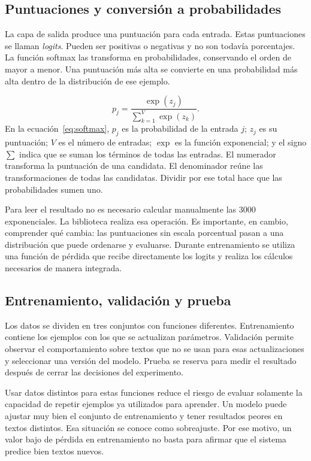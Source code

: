 \subsection{Puntuaciones y conversión a probabilidades}
La capa de salida produce una puntuación para cada entrada. Estas puntuaciones se llaman \emph{logits}. Pueden ser positivas o negativas y no son todavía porcentajes. La función softmax las transforma en probabilidades, conservando el orden de mayor a menor. Una puntuación más alta se convierte en una probabilidad más alta dentro de la distribución de ese ejemplo.

\begin{equation}\label{eq:softmax}
p_j=\frac{\exp(z_j)}{\sum_{k=1}^{V}\exp(z_k)}.
\end{equation}
En la ecuación~\ref{eq:softmax}, $p_j$ es la probabilidad de la entrada $j$; $z_j$ es su puntuación; $V$ es el número de entradas; $\exp$ es la función exponencial; y el signo $\sum$ indica que se suman los términos de todas las entradas. El numerador transforma la puntuación de una candidata. El denominador reúne las transformaciones de todas las candidatas. Dividir por ese total hace que las probabilidades sumen uno.

Para leer el resultado no es necesario calcular manualmente las 3000 exponenciales. La biblioteca realiza esa operación. Es importante, en cambio, comprender qué cambia: las puntuaciones sin escala porcentual pasan a una distribución que puede ordenarse y evaluarse. Durante entrenamiento se utiliza una función de pérdida que recibe directamente los logits y realiza los cálculos necesarios de manera integrada.

\subsection{Entrenamiento, validación y prueba}
Los datos se dividen en tres conjuntos con funciones diferentes. Entrenamiento contiene los ejemplos con los que se actualizan parámetros. Validación permite observar el comportamiento sobre textos que no se usan para esas actualizaciones y seleccionar una versión del modelo. Prueba se reserva para medir el resultado después de cerrar las decisiones del experimento.

Usar datos distintos para estas funciones reduce el riesgo de evaluar solamente la capacidad de repetir ejemplos ya utilizados para aprender. Un modelo puede ajustar muy bien el conjunto de entrenamiento y tener resultados peores en textos distintos. Esa situación se conoce como sobreajuste. Por ese motivo, un valor bajo de pérdida en entrenamiento no basta para afirmar que el sistema predice bien textos nuevos.

